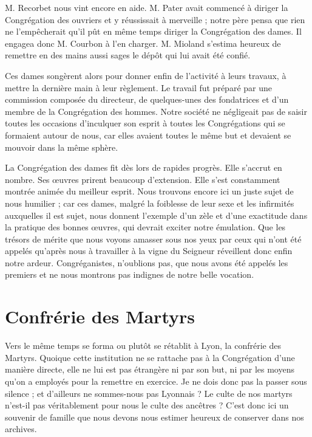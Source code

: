 M. Recorbet nous vint encore en aide. M. Pater avait commencé à diriger la Congrégation des ouvriers et y réussissait à merveille ; notre père pensa que rien ne l'empêcherait qu'il pût en même temps diriger la Congrégation des dames. Il engagea donc M. Courbon à l'en charger. M. Mioland s'estima heureux de remettre en des mains aussi sages le dépôt qui lui avait été confié.

Ces dames songèrent alors pour donner enfin de l'activité à leurs travaux, à mettre la dernière main à leur règlement. Le travail fut préparé par une commission composée du directeur, de quelques-unes des fondatrices et d'un membre de la Congrégation des hommes. Notre société ne négligeait
pas de saisir toutes les occasions d'inculquer son esprit à toutes les Congrégations qui se formaient autour de nous, car elles avaient toutes le même but et devaient se mouvoir dans la même sphère.

La Congrégation des dames fit dès lors de rapides progrès. Elle s'accrut en nombre. Ses œuvres prirent beaucoup d'extension. Elle s'est constamment montrée animée du meilleur esprit. Nous trouvons encore ici un juste sujet de nous humilier ; car ces dames, malgré la foiblesse de leur sexe et les infirmités auxquelles il est sujet, nous donnent l'exemple d'un zèle et d'une exactitude dans la pratique des bonnes œuvres, qui devrait exciter notre émulation. Que les trésors de mérite que nous voyons amasser sous nos yeux par ceux qui n'ont été appelés qu'après nous à travailler à la vigne du Seigneur réveillent donc enfin notre ardeur. Congréganistes, n'oublions pas, que nous avons été appelés les premiers et ne nous montrons pas indignes de notre belle vocation.

\section*{Confrérie des Martyrs}
Vers le même temps se forma ou plutôt se rétablit à Lyon, la confrérie des Martyrs. Quoique cette institution ne se rattache pas à la Congrégation d'une manière directe, elle ne lui est pas étrangère ni par son but, ni par les moyens qu'on a employés pour la remettre en exercice. Je ne dois donc pas la passer sous silence ; et d'ailleurs ne sommes-nous pas Lyonnais ? Le culte de nos martyrs n'est-il pas véritablement pour nous le culte des ancêtres ? C'est donc ici un souvenir de famille que nous devons nous estimer heureux de conserver dans nos archives.


